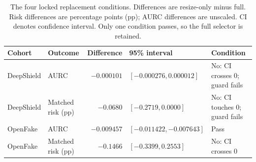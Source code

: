 \begin{table}[t]
\caption{The four locked replacement conditions. Differences are resize-only minus full. Risk differences are percentage points (pp); AURC differences are unscaled. CI denotes confidence interval. Only one condition passes, so the full selector is retained.}
\label{tab:ablationdecision}
\centering\small
\begin{tabular}{llrll}
\toprule
Cohort & Outcome & Difference & 95\% interval & Condition \\
\midrule
DeepShield & AURC & $-0.000101$ & $[-0.000276, 0.000012]$ & No: CI crosses 0; guard fails \\
DeepShield & Matched risk (pp) & $-0.0680$ & $[-0.2719, 0.0000]$ & No: CI touches 0; guard fails \\
OpenFake & AURC & $-0.009457$ & $[-0.011422, -0.007643]$ & Pass \\
OpenFake & Matched risk (pp) & $-0.1466$ & $[-0.3399, 0.2553]$ & No: CI crosses 0 \\
\bottomrule
\end{tabular}
\end{table}
